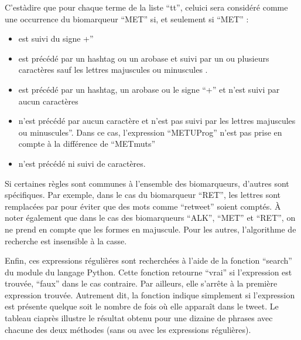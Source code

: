 \documentclass[letterpaper,10pt,english]{jupyterBook}
\begin{document}
\sphinxAtStartPar
C’est\sphinxhyphen{}à\sphinxhyphen{}dire que pour chaque terme de la liste “tt”, celui\sphinxhyphen{}ci sera considéré comme une occurrence du biomarqueur “MET” si, et seulement si “MET” :
\begin{itemize}
\item {} 
\sphinxAtStartPar
est suivi du signe +”

\item {} 
\sphinxAtStartPar
{} est précédé par un hashtag ou un arobase et suivi par un ou plusieurs caractères sauf les lettres majuscules ou minuscules .

\item {} 
\sphinxAtStartPar
{} est précédé par un hashtag, un arobase ou le signe “+” et n’est suivi par aucun caractères

\item {} 
\sphinxAtStartPar
{} n’est précédé par aucun caractère et n’est pas suivi par les lettres  majuscules ou minuscules”. Dans ce cas, l’expression “METUProg” n’est pas prise en compte à la différence de “METmuts”

\item {} 
\sphinxAtStartPar
{} n’est précédé ni suivi de caractères.

\end{itemize}

\sphinxAtStartPar
Si certaines règles sont communes à l’ensemble des biomarqueurs, d’autres sont spécifiques. Par exemple, dans le cas du biomarqueur “RET”, les lettres   sont remplacées par  pour éviter que des mots comme “retweet” soient comptés. À noter également que dans le cas des biomarqueurs “ALK”, “MET” et “RET”, on ne prend en compte que les formes en majuscule. Pour les autres, l’algorithme de recherche est insensible à la casse.

\sphinxAtStartPar
Enfin, ces expressions régulières sont recherchées à l’aide de la fonction “search” du module  du langage Python. Cette fonction retourne “vrai” si l’expression est trouvée, “faux” dans le cas contraire. Par ailleurs, elle s’arrête à la première expression trouvée. Autrement dit, la fonction indique simplement si l’expression est présente quelque soit le nombre de fois où elle apparaît dans le tweet. Le tableau ci\sphinxhyphen{}après illustre le résultat obtenu pour une dizaine de phrases avec chacune des deux méthodes (sans ou avec les expressions régulières).
\end{document}
